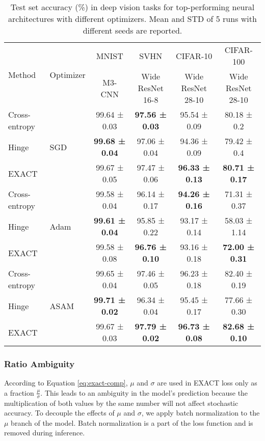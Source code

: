 \documentclass[nohyperref]{article}
\theoremstyle{plain}
\theoremstyle{definition}
\theoremstyle{remark}
\begin{document}
\begin{table*}[t]
\centering
\vskip 0.2in
\begin{tabular}{l|l|cccc}
\multirow{2}{*}{Method} & \multirow{2}{*}{Optimizer} & MNIST & SVHN & CIFAR-10 & CIFAR-100 \\
& & \scriptsize M3-CNN & \scriptsize Wide ResNet 16-8 & \scriptsize Wide ResNet 28-10 & \scriptsize Wide ResNet 28-10 \\
\hline
Cross-entropy & \multirow{3}{*}{SGD} & 99.64 ± 0.03 & \bf 97.56 ± 0.03 & 95.54 ± 0.09 & 80.18 ± 0.2 \\
Hinge & & \bf 99.68 ± 0.04 & 97.06 ± 0.04 & 94.36 ± 0.09 & 79.42 ± 0.4 \\
EXACT & & 99.67 ± 0.05 & 97.47 ± 0.06 & \bf 96.33 ± 0.13 & \bf 80.71 ± 0.17 \\
\hline
Cross-entropy & \multirow{3}{*}{Adam}
        & 99.58 ± 0.04 & 96.14 ± 0.17 & \bf 94.26 ± 0.16 & 71.31 ± 0.37 \\
Hinge & & \bf 99.61 ± 0.04 & 95.85 ± 0.22 & 93.17 ± 0.14 & 58.03 ± 1.14 \\
EXACT & & 99.58 ± 0.08 & \bf 96.76 ± 0.10 & 93.16 ± 0.18 & \bf 72.00 ± 0.31 \\
\hline
Cross-entropy & \multirow{3}{*}{ASAM} & 99.65 ± 0.04 & 97.46 ± 0.05 & 96.23 ± 0.18 & 82.40 ± 0.19 \\
Hinge & & \bf 99.71 ± 0.02 & 96.34 ± 0.04 & 95.45 ± 0.17 & 77.66 ± 0.30\\
EXACT & & 99.67 ± 0.03 & \bf 97.79 ± 0.02 & \bf 96.73 ± 0.08 & \bf 82.68 ± 0.10 \\
\end{tabular}
\vskip 0.2in
\caption{Test set accuracy (\%) in deep vision tasks for top-performing neural architectures with different optimizers. Mean and STD of 5 runs with different seeds are reported.}
\label{tab:vision}
\end{table*}

\subsubsection{Ratio Ambiguity}
According to Equation \ref{eq:exact-comp}, $\mu$ and $\sigma$ are used in EXACT loss only as a fraction $\frac{\mu}{\sigma}$. This leads to an ambiguity in the model's prediction because the multiplication of both values by the same number will not affect stochastic accuracy. To decouple the effects of $\mu$ and $\sigma$, we apply batch normalization \cite{ioffe2015batch} to the $\mu$ branch of the model. Batch normalization is a part of the loss function and is removed during inference.
\end{document}
